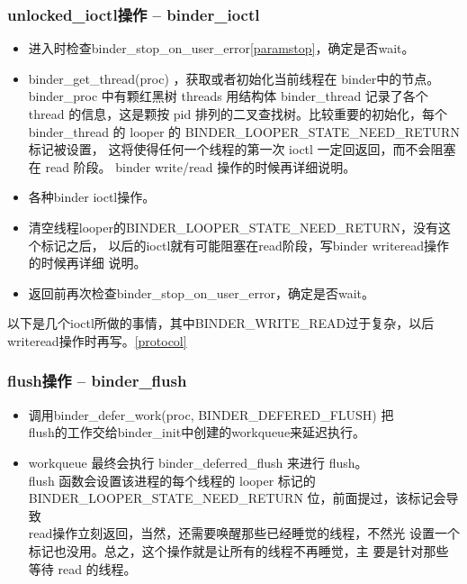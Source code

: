 \documentclass[a4paper,11pt]{article}
\begin{document}
\subsubsection{unlocked_ioctl操作 -- binder_ioctl}
\begin{itemize}
    \item 进入时检查binder_stop_on_user_error{\tiny\ref{paramstop}}，确定是否wait。
    \item  binder_get_thread(proc) ，获取或者初始化当前线程在 binder中的节点。
        binder_proc 中有颗红黑树 threads 用结构体 binder_thread 记录了各个
        thread 的信息，这是颗按 pid 排列的二叉查找树。比较重要的初始化，每个
        binder_thread 的 looper 的 BINDER_LOOPER_STATE_NEED_RETURN标记被设置，
        这将使得任何一个线程的第一次 ioctl 一定回返回，而不会阻塞在 read 阶段。
        binder write/read 操作的时候再详细说明。
    \item 各种binder ioctl操作。
    \item 清空线程looper的BINDER_LOOPER_STATE_NEED_RETURN，没有这个标记之后，
        以后的ioctl就有可能阻塞在read阶段，写binder writeread操作的时候再详细
        说明。
    \item 返回前再次检查binder_stop_on_user_error，确定是否wait。
\end{itemize}

以下是几个ioctl所做的事情，其中BINDER_WRITE_READ过于复杂，以后
writeread操作时再写。\ref{protocol}

\subsubsection{flush操作 -- binder_flush}
\begin{itemize}
    \item 调用binder_defer_work(proc, BINDER_DEFERED_FLUSH)
        把\\flush的工作交给binder_init中创建的workqueue来延迟执行。
    \item workqueue 最终会执行 binder_deferred_flush 来进行 flush。
        \\flush 函数会设置该进程的每个线程的 looper 标记的
        BINDER_LOOPER_STATE_NEED_RETURN 位，前面提过，该标记会导致
        \\read操作立刻返回，当然，还需要唤醒那些已经睡觉的线程，不然光
        设置一个标记也没用。总之，这个操作就是让所有的线程不再睡觉，主
        要是针对那些等待 read 的线程。
\end{itemize}
\end{document}
